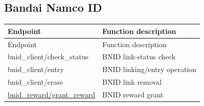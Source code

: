 \subsection{Bandai Namco ID}

\begin{longtable}{>{\ttfamily}p{}p{}}
\toprule
Endpoint & Function description \\
\midrule
\endfirsthead%

\toprule
Endpoint & Function description \\
\midrule
\endhead%

bnid\_client/check\_status
    & BNID link-status check \\

bnid\_client/entry
    & BNID linking/entry operation \\

bnid\_client/erase
    & BNID link removal \\

\hyperref[subsec:api_bnid_reward_grant_reward]
    {bnid\_reward/grant\_reward}
    & BNID reward grant \\

\bottomrule
\end{longtable}